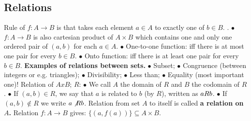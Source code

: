 \documentclass{article}
\begin{document}
\subsection{Relations}
Rule of $f: A \rightarrow B$ is that takes each element $a \in A$ to exactly one of $b \in B$.
\newline
\newline
{}.
\newline
\newline
$\bullet $ $f:A \rightarrow B$ is also cartesian product of $A \times B$ which contains one and only one ordered pair of $(a, b)$ for each $a \in A$.
\newline
$\bullet $ One-to-one function: iff there is at most one pair for every $b \in B$.
\newline
$\bullet $ Onto function: iff there is at least one pair for every $b \in B$.
\newline
\newline
\textbf{ Examples of relations between sets. }
\newline
\newline
$\bullet $ Subset;
\newline
$\bullet $ Congruence (between integers or e.g. triangles);
\newline
$\bullet $ Divisibility;
\newline
$\bullet $ Less than;
\newline
$\bullet $ Equality (most important one)!
\newline
\newline
Relation of $A x B$; $R$:
\newline
\newline
$\bullet $ We call $A$ the domain of $R$ and $B$ the codomain of $R$.
\newline
$\bullet $ If $(a, b) \in R$, we say that $a$ is related to $b$ (by $R$), written as $a \space R \space b$.
\newline
$\bullet $ If $(a, b) \not \in R$ we write $a \space \not R \space b$.
\newline
\newline
Relation from set $A$ to itself is called \textbf{ a relation on $A$. }
\newline
\newline
Relation $f: A \rightarrow B$ gives: $\{(a, f(a))\} \subseteq A \times B.$
\newline
{}
\newline
\end{document}
